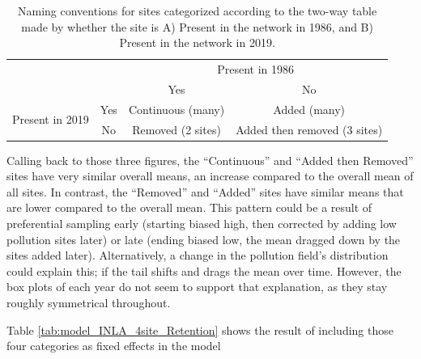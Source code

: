 \documentclass{article}
\begin{document}
\begin{table}[ht]
    \centering
    \begin{tabular}{| c c | c c |}
        \hline
         \multirow{2}{*}{} & {} & \multicolumn{2}{c}{Present in 1986} \\
                           & {} & Yes & No \\
        \hline 
        \multirow{2}{*}{Present in 2019} & Yes & Continuous (many) & Added (many) \\
                                         & No & Removed (2 sites) & Added then removed (3 sites)   \\
         \hline
    \end{tabular}
    \caption{Naming conventions for sites categorized according to the two-way table made by whether the site is A) Present in the network in 1986, and B) Present in the network in 2019.}
    \label{tab:2X2_site_category}
\end{table}

Calling back to those three figures, the ``Continuous'' and ``Added then Removed'' sites have very similar overall means, an increase compared to the overall mean of all sites.  In contrast, the ``Removed'' and ``Added'' sites have similar means that are lower compared to the overall mean.
This pattern could be a result of preferential sampling early (starting biased high, then corrected by adding low pollution sites later) or late (ending biased low, the mean dragged down by the sites added later). Alternatively, a change in the pollution field's distribution could explain this; if the tail shifts and drags the mean over time.  However, the box plots of each year do not seem to support that explanation,
as they stay roughly symmetrical throughout.

Table \ref{tab:model_INLA_4site_Retention} shows the result of including those four categories as fixed effects in the model
\end{document}
